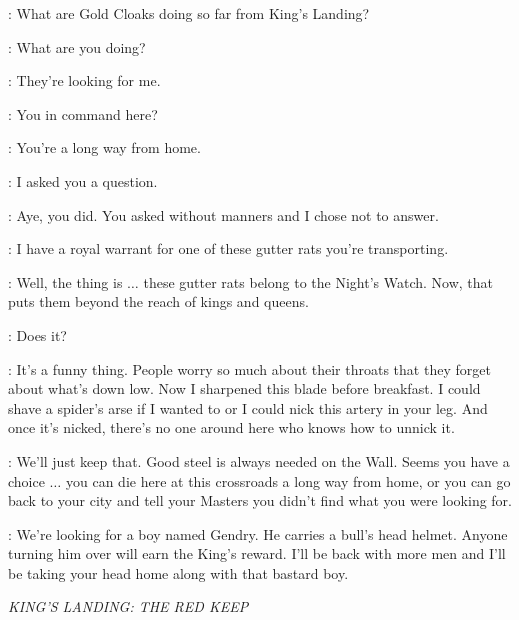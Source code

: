
\ARYA: What are Gold Cloaks doing so far from King's Landing?


\GENDRY: What are you doing?

\ARYA: They're looking for me.

\GOLDCLOAK: You in command here?

\YOREN: You're a long way from home.

\GOLDCLOAK: I asked you a question.

\YOREN: Aye, you did. You asked without manners and I chose not to answer.

\GOLDCLOAK: I have a royal warrant for one of these gutter rats you're transporting.

\YOREN: Well, the thing is $\ldots$ these gutter rats belong to the Night's Watch. Now, that puts them beyond the reach of kings and queens.

\GOLDCLOAK: Does it?


\YOREN: It's a funny thing. People worry so much about their throats that they forget about what's down low. Now I sharpened this blade before breakfast. I could shave a spider's arse if I wanted to or I could nick this artery in your leg. And once it's nicked, there's no one around here who knows how to unnick it.


\YOREN: We'll just keep that. Good steel is always needed on the Wall. Seems you have a choice $\ldots$ you can die here at this crossroads a long way from home, or you can go back to your city and tell your Masters you didn't find what you were looking for.

\GOLDCLOAK: We're looking for a boy named Gendry. He carries a bull's head helmet. Anyone turning him over will earn the King's reward. I'll be back with more men and I'll be taking your head home along with that bastard boy.


\scene

\textit{KING'S LANDING: THE RED KEEP}


